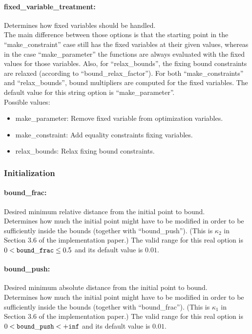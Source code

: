 \paragraph{fixed\_variable\_treatment:} Determines how fixed variables should be handled. $\;$ \\
The main difference between those options is that the starting point in the ``make\_constraint'' case still has the fixed variables at their given values, whereas in the case ``make\_parameter''
the functions are always evaluated with the fixed values for those variables. 
Also, for ``relax\_bounds'', the fixing bound constraints are relaxed (according to ``bound\_relax\_factor'').
For both ``make\_constraints'' and ``relax\_bounds'', bound multipliers are computed for the fixed variables.
The default value for this string option is ``make\_parameter''.
\\ 
Possible values:
\begin{itemize}
\item make\_parameter:    Remove fixed variable from optimization variables.
\item make\_constraint:   Add equality constraints fixing variables.
\item relax\_bounds:      Relax fixing bound constraints.
\end{itemize}


\subsubsection{Initialization}

\paragraph{bound\_frac:} Desired minimum relative distance from the initial point to bound. $\;$ \\
 Determines how much the initial point might have
to be modified in order to be sufficiently inside
the bounds (together with ``bound\_push'').
(This is $\kappa_2$ in Section 3.6 of the implementation paper.)
The valid range for this real option is 
$0 <  {\tt bound\_frac } \le 0.5$
and its default value is $0.01$.


\paragraph{bound\_push:} Desired minimum absolute distance from the initial point to bound. $\;$ \\
 Determines how much the initial point might have
to be modified in order to be sufficiently inside
the bounds (together with ``bound\_frac'').
(This is $\kappa_1$ in Section 3.6 of the implementation paper.)
The valid range for this real option is 
$0 <  {\tt bound\_push } <  {\tt +inf}$
and its default value is $0.01$.


